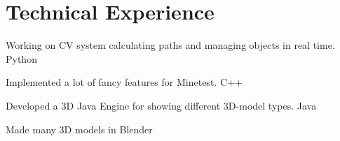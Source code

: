 \documentclass[]{deedy-resume-openfont}
\begin{document}
\vspace{\topsep}
\begin{minipage}[t]{1\textwidth}
\section{Technical Experience}
\begin{tightemize}
\vspace{\topsep}
\large
\item Working on CV system calculating paths and managing objects in real time. Python
\item Implemented a lot of fancy features for Minetest. C++
\item Developed a 3D Java Engine for showing different 3D-model types. Java
\item Made many 3D models in Blender


\end{tightemize}
\sectionsep
\end{minipage}
\end{document}
